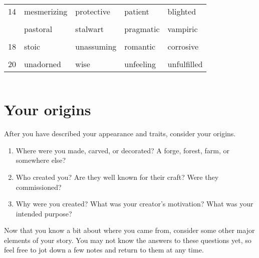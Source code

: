 \documentclass[
  a5paper,
]{article}
\providecommand{\tightlist}{%
  \setlength{\itemsep}{0pt}\setlength{\parskip}{0pt}}
\begin{document}
\begin{table}
\begin{tabular}[t]{rllll}
14 & mesmerizing & protective & patient & blighted\\
\cellcolor{gray!6}{15} & \cellcolor{gray!6}{opulent} & \cellcolor{gray!6}{resilient} & \cellcolor{gray!6}{practical} & \cellcolor{gray!6}{draining}\\
\addlinespace
16 & pastoral & stalwart & pragmatic & vampiric\\
\cellcolor{gray!6}{17} & \cellcolor{gray!6}{resourceful} & \cellcolor{gray!6}{tender} & \cellcolor{gray!6}{protective} & \cellcolor{gray!6}{parasitic}\\
18 & stoic & unassuming & romantic & corrosive\\
\cellcolor{gray!6}{19} & \cellcolor{gray!6}{terrifying} & \cellcolor{gray!6}{vengeful} & \cellcolor{gray!6}{sturdy} & \cellcolor{gray!6}{wary}\\
20 & unadorned & wise & unfeeling & unfulfilled\\
\bottomrule
\end{tabular}
\end{table}

\pagebreak

\(~\)

\hypertarget{your-origins}{%
\section{Your origins}\label{your-origins}}

After you have described your appearance and traits, consider your origins.

\begin{enumerate}
\def\labelenumi{\arabic{enumi}.}
\tightlist
\item
  Where were you made, carved, or decorated? A forge, forest, farm, or somewhere else?
\item
  Who created you? Are they well known for their craft? Were they commissioned?
\item
  Why were you created? What was your creator's motivation? What was your intended purpose?
\end{enumerate}

Now that you know a bit about where you came from, consider some other major elements of your story. You may not know the answers to these questions yet, so feel free to jot down a few notes and return to them at any time.
\end{document}
